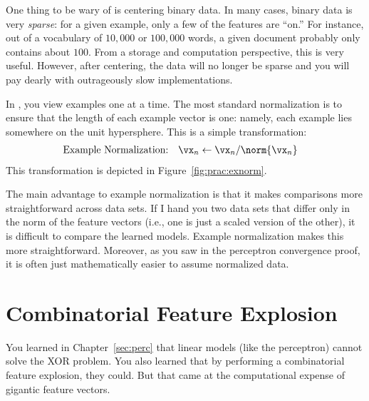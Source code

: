 One thing to be wary of is centering binary data.  In many cases,
binary data is very \emph{sparse}: for a given example, only a few of
the features are ``on.''  For instance, out of a vocabulary of
$10,000$ or $100,000$ words, a given document probably only contains
about $100$.  From a storage and computation perspective, this is very
useful.  However, after centering, the data will no longer be sparse and
you will pay dearly with outrageously slow implementations.


In , you view examples one at a time.
The most standard normalization is to ensure that the length of each
example vector is one: namely, each example lies somewhere on the unit
hypersphere.  This is a simple transformation:
\begin{align}
\text{Example Normalization:} && \vx_{n} &\leftarrow \vx_{n} / \norm{\vx_n}
\end{align}
This transformation is depicted in Figure~\ref{fig:prac:exnorm}.

The main advantage to example normalization is that it makes
comparisons more straightforward across data sets.  If I hand you two
data sets that differ only in the norm of the feature vectors (i.e.,
one is just a scaled version of the other), it is difficult to compare
the learned models.  Example normalization makes this more
straightforward.  Moreover, as you saw in the perceptron convergence
proof, it is often just mathematically easier to assume normalized
data.

\section{Combinatorial Feature Explosion}
\label{sec:prac:combinatorial}

You learned in Chapter~\ref{sec:perc} that linear models (like the
perceptron) cannot solve the XOR problem.  You also learned that by
performing a combinatorial feature explosion, they could.  But that
came at the computational expense of gigantic feature vectors.

